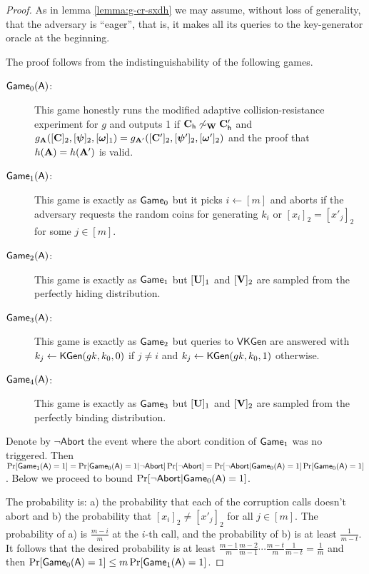 \begin{proof}
As in lemma \ref{lemma:g-cr-sxdh} we may assume, without loss of generality, that the adversary is ``eager'', that is, it makes all its queries to the key-generator oracle at the beginning.

The proof follows from the indistinguishability of the following games.
\begin{description}
\item[$\mathsf{Game}_0(\mathsf{A})$:] This game honestly runs the modified adaptive collision-resistance experiment for $g$ and outputs 1 if $\mathbf{{C}}_\mathsf{h} \not\sim_{\mathbf{{W}}} \mathbf{{C}}'_\mathsf{h}$ and $g_{\mathbf{{A}}}([\mathbf{{C}}]_2,[{\boldsymbol{\psi}}]_2,\allowbreak [{\boldsymbol{\omega}}]_1)=g_{\mathbf{{A}}'}([\mathbf{{C}}']_2,[{\boldsymbol{\psi}}']_2,[{\boldsymbol{\omega}}']_2)$ and the proof that $h(\mathbf{{A}})=h(\mathbf{{A}}')$ is valid.
\item[$\mathsf{Game}_1(\mathsf{A})$:] This game is exactly as $\mathsf{Game}_0$ but it picks $i\gets[m]$ and aborts if the adversary requests the random coins for generating $k_i$ or $[x_i]_2=[x'_j]_2$ for some $j\in[m]$.
\item[$\mathsf{Game}_2(\mathsf{A})$:] This game is exactly as $\mathsf{Game}_1$ but $[\mathbf{{U}}]_1$ and $[\mathbf{{V}}]_2$ are sampled from the perfectly hiding distribution.
\item[$\mathsf{Game}_3(\mathsf{A})$:] This game is exactly as $\mathsf{Game}_2$ but queries to $\mathsf{VKGen}$ are answered with $k_j\gets\mathsf{KGen}(gk,k_0,0)$ if $j\neq i$ and $k_j\gets\mathsf{KGen}(gk,k_0,1)$ otherwise.
\item[$\mathsf{Game}_4(\mathsf{A})$:] This game is exactly as $\mathsf{Game}_3$ but $[\mathbf{{U}}]_1$ and $[\mathbf{{V}}]_2$ are sampled from the perfectly binding distribution.
\end{description}
Denote by $\neg\mathsf{Abort}$ the event where the abort condition of $\mathsf{Game}_1$ was no triggered. Then
$
\Pr[\mathsf{Game}_1(\mathsf{A})=1] = \Pr[\mathsf{Game}_0(\mathsf{A})=1|\neg\mathsf{Abort}]\Pr[\neg\mathsf{Abort}]
=\Pr[\neg\mathsf{Abort}|\allowbreak\mathsf{Game}_0(\mathsf{A})=1]\Pr[\mathsf{Game}_0(\mathsf{A})=1]$.
Below we proceed to bound $\Pr[\neg\mathsf{Abort}|\mathsf{Game}_0(\mathsf{A})=1]$.

The probability is: a) the probability that each of the corruption calls doesn't abort and b) the probability that $[x_i]_2\neq[x'_j]_2$ for all $j\in[m]$. The probability of a) is $\frac{m-i}{m}$ at the $i$-th call, and the probability of b) is at least $\frac{1}{m-t}$. It follows that the desired probability is at least $\frac{m-1}{m}\frac{m-2}{m-1}\cdots\frac{m-t}{m}\frac{1}{m-t}=\frac{1}{m}$ and then $\Pr[\mathsf{Game}_0(\mathsf{A})=1]\leq m \Pr[\mathsf{Game}_1(\mathsf{A})=1]$.


\end{proof}
